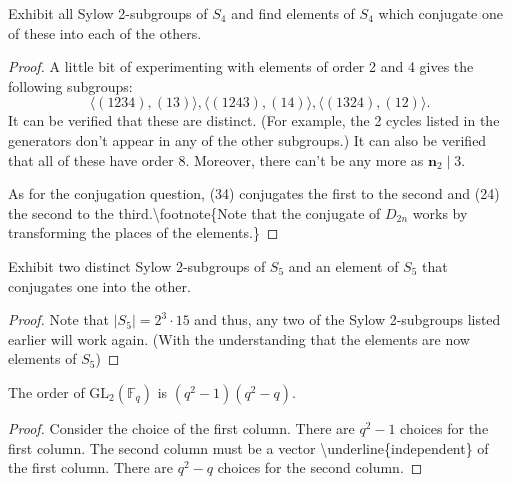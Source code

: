 \begin{exercise}
Exhibit all Sylow 2-subgroups of $S_4$ and find elements of $S_4$ which conjugate one of these into each of the others.
\end{exercise}
\begin{proof}
A little bit of experimenting with elements of order 2 and 4 gives the following subgroups:
\[
\langle(1234),(13)\rangle,\langle(1243),(14)\rangle,\langle(1324),(12)\rangle .
\]
It can be verified that these are distinct. (For example, the 2 cycles listed in the generators don't appear in any of the other subgroups.) It can also be verified that all of these have order 8. Moreover, there can't be any more as $\boldsymbol{n}_2 \mid 3$.

As for the conjugation question, (34) conjugates the first to the second and (24) the second to the third.\textbackslash{}footnote\{Note that the conjugate of $D_{2n}$ works by transforming the places of the elements.\}
\end{proof}

\begin{exercise}
Exhibit two distinct Sylow 2-subgroups of $S_5$ and an element of $S_5$ that conjugates one into the other.
\end{exercise}
\begin{proof}
Note that $\left|S_5\right|=2^3 \cdot 15$ and thus, any two of the Sylow 2-subgroups listed earlier will work again. (With the understanding that the elements are now elements of $S_5$)
\end{proof}

\begin{lemma}
The order of $\mathrm{GL}_2(\mathbb{F}_q)$ is $(q^2-1)(q^2-q)$.
\end{lemma}
\begin{proof}
Consider the choice of the first column. There are $q^2-1$ choices for the first column. The second column must be a vector \textbackslash{}underline\{independent\} of the first column. There are $q^2-q$ choices for the second column.
\end{proof}

